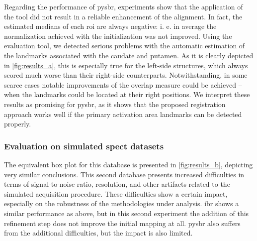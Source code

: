 \documentclass{frontiers}
\begin{document}
Regarding the performance of \gls*{pysbr}, experiments show that the application of the tool
  did not result in a reliable enhancement of the alignment.
In fact, the estimated medians of each \gls*{roi} are always negative: i. e. in average
  the normalization achieved with the initialization was not improved.
Using the evaluation tool, we detected serious problems with the automatic 
  estimation of the landmarks associated with the caudate and putamen.
As it is clearly depicted in \autoref{fig:results_a}, this is especially true for the left-side
  structures, which always scored much worse than their right-side counterparts.
Notwithstanding, in some scarce cases notable improvements of the overlap measure could be achieved
  --  when the landmarks could be located at their right positions.
We interpret these results as promising for \gls*{pysbr}, as it shows that the proposed registration 
  approach works well if the primary activation area landmarks can be detected properly.

\subsubsection{Evaluation on simulated \gls*{spect} datasets}
\label{sec:results_simulated}
The equivalent box plot for this database is presented in \autoref{fig:results_b},
  depicting very similar conclusions.
This second database presents increased difficulties in terms of signal-to-noise
  ratio, resolution, and other artifacts related to the simulated acquisition
  procedure.
These difficulties show a certain impact, especially on the robustness of the
  methodologies under analysis.
\Gls*{ibr} shows a similar performance as above, but in this second experiment the addition
  of this refinement step does not improve the initial mapping at all.
\Gls*{pysbr} also suffers from the additional difficulties, but the impact is
  also limited.
\end{document}
